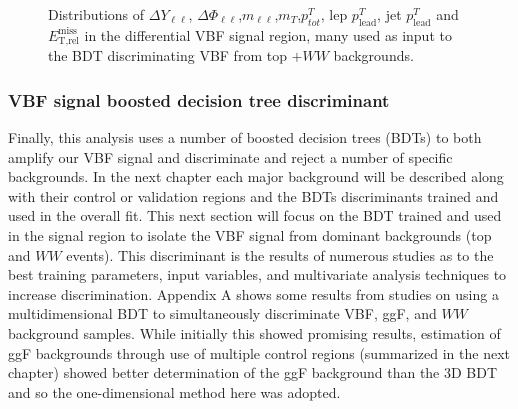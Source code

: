 \begin{figure}[!h]
{  }\hfill
  \hfill
{\caption{Distributions of $\Delta Y_{\ell\ell}$, $\Delta \Phi_{\ell\ell}$,$m_{\ell\ell}$,$m_T$,$p^T_{tot}$, lep $p^T_{\text{lead}}$, jet $p^T_{\text{lead}}$ and $\ensuremath{E_{\text{T,rel}}^{\text{miss}}}$ in the differential VBF signal region, many used as input to the BDT discriminating VBF from top $+WW$ backgrounds.
\label{fig:signalregion}}}
\end{figure}

\subsubsection{VBF signal boosted decision tree discriminant}
Finally, this analysis uses a number of boosted decision trees (BDTs) to both amplify our VBF signal and discriminate and reject a number of specific backgrounds. In the next chapter each major background will be described along with their control or validation regions and the BDTs discriminants trained and used in the overall fit. This next section will focus on the BDT trained and used in the signal region to isolate the VBF signal from dominant backgrounds (top and $WW$ events). This discriminant is the results of numerous studies as to the best training parameters, input variables, and multivariate analysis techniques to increase discrimination. Appendix A shows some results from studies on using a multidimensional BDT to simultaneously discriminate VBF, ggF, and $WW$ background samples. While initially this showed promising results, estimation of ggF backgrounds through use of multiple control regions (summarized in the next chapter) showed better determination of the ggF background than the 3D BDT and so the one-dimensional method here was adopted. 

